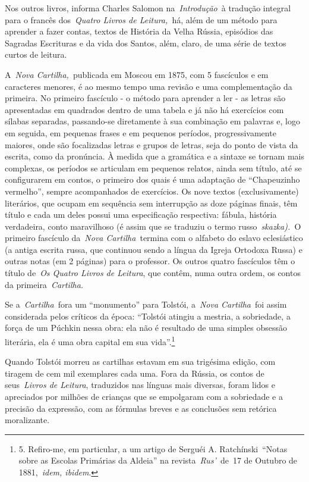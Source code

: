 Nos outros livros, informa Charles Salomon na\emph{~Introdução}~à
tradução integral para o francês dos~\emph{Quatro Livros de
Leitura,~}há, além de um método para aprender a fazer contas, textos de
História da Velha Rússia, episódios das Sagradas Escrituras e da vida
dos Santos, além, claro, de uma série de textos curtos de leitura.

A~\emph{Nova Cartilha,~}publicada em Moscou em 1875, com 5 fascículos e
em caracteres menores, é ao mesmo tempo uma revisão e uma complementação
da primeira. No primeiro fascículo - o método para aprender a ler - as
letras são apresentadas em quadrados dentro de uma tabela e já não há
exercícios com sílabas separadas, passando-se diretamente à sua
combinação em palavras e, logo em seguida, em pequenas frases e em
pequenos períodos, progressivamente maiores, onde são focalizadas letras
e grupos de letras, seja do ponto de vista da escrita, como da
pronúncia. À medida que a gramática e a sintaxe se tornam mais
complexas, os períodos se articulam em pequenos relatos, ainda sem
título, até se configurarem em contos, o primeiro dos quais é uma
adaptação de ``Chapeuzinho vermelho'', sempre acompanhados de
exercícios. Os nove textos (exclusivamente) literários, que ocupam em
sequência sem interrupção as doze páginas finais, têm título e cada um
deles possui uma especificação respectiva: fábula, história verdadeira,
conto maravilhoso (é assim que se traduziu o termo
russo~\emph{skazka).~}O primeiro fascículo da~\emph{Nova
Cartilha}~termina com o alfabeto do eslavo eclesiástico (a antiga
escrita russa, que continuou sendo a língua da Igreja Ortodoxa Russa) e
outras notas (em 2 páginas) para o professor. Os outros quatro
fascículos têm o título de~\emph{Os Quatro Livros de Leitura}, que
contêm, numa outra ordem, os contos da primeira~\emph{Cartilha.}

Se a~\emph{Cartilha~}fora um ``monumento'' para Tolstói, a~\emph{Nova
Cartilha}~foi assim considerada pelos críticos da época: ``Tolstói
atingiu a mestria, a sobriedade, a força de um Púchkin nessa obra: ela
não é resultado de uma simples obsessão literária, ela é uma obra
capital em sua vida''.\footnote{5. Refiro-me, em particular, a um artigo
  de Serguéi A. Ratchínski~``Notas sobre as Escolas Primárias da
  Aldeia'' na revista~\emph{Rus'}~de~17 de Outubro de 1881,~\emph{idem,
  ibidem}.}

Quando Tolstói morreu as cartilhas estavam em sua trigésima edição, com
tiragem de cem mil exemplares cada uma. Fora da Rússia, os contos de
seus~\emph{Livros de Leitura}, traduzidos nas línguas mais diversas,
foram lidos e apreciados por milhões de crianças que se empolgaram com a
sobriedade e a precisão da expressão, com as fórmulas breves e as
conclusões sem retórica moralizante.

